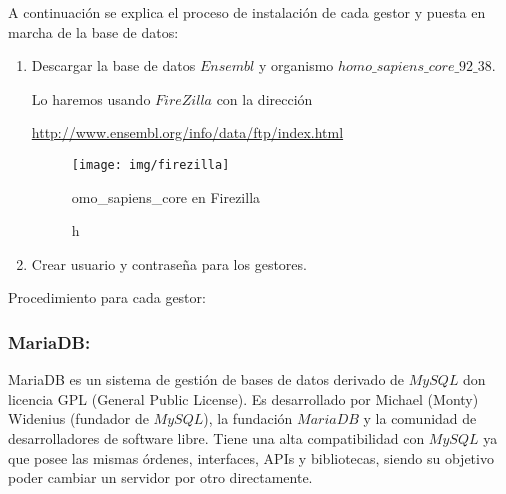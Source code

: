 \documentclass[12pt,a4paper]{article}
\begin{document}
A continuación se explica el proceso de instalación de cada gestor y puesta en marcha de la base de datos:

\begin{enumerate}

\item Descargar la base de datos $Ensembl$ y organismo $homo\_sapiens\_core\_92\_38.$

Lo haremos usando $FireZilla$  con la dirección   

\href{http://www.ensembl.org/info/data/ftp/index.html}{http://www.ensembl.org/info/data/ftp/index.html}
\begin{figure}[!h]
\centering
\texttt{[image: img/firezilla]}

\caption homo\_sapiens\_core en Firezilla
\label{fig1:fire} 
\end{figure}

\item Crear usuario y contraseña para los gestores.


\end{enumerate}

\newpage

Procedimiento para cada gestor:

\subsubsection{MariaDB:} \label{pto211}

MariaDB es un sistema de gestión de bases de datos derivado de $MySQL$ don licencia GPL (General Public License). Es desarrollado por Michael (Monty) Widenius (fundador de $MySQL$), la fundación $MariaDB$ y la comunidad de desarrolladores de software libre. Tiene una alta compatibilidad con $MySQL$ ya que posee las mismas órdenes, interfaces, APIs y bibliotecas, siendo su objetivo poder cambiar un servidor por otro directamente.
\end{document}
